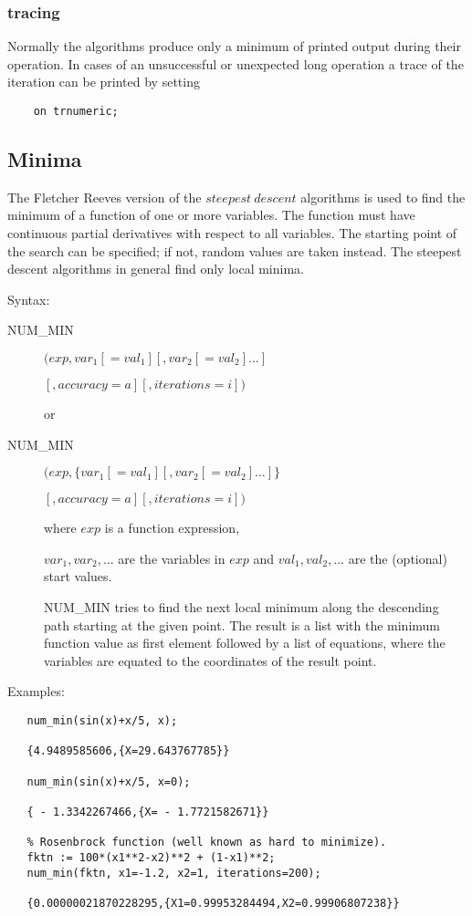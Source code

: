 \subsubsection{tracing}

Normally the algorithms produce only a minimum of printed
output during their operation. In cases of an unsuccessful
or unexpected long operation a trace of the iteration can be
printed by setting
\begin{verbatim}
    on trnumeric;
\end{verbatim}


\subsection{Minima}

The Fletcher Reeves version of the $steepest\ descent$
algorithms is used to find the minimum of a
function of one or more variables. The
function must have continuous partial derivatives with respect to all
variables. The starting point of the search can be
specified; if not, random values are taken instead.
The steepest descent algorithms in general find only local
minima.

Syntax:

\begin{description}
\item[NUM\_MIN] $(exp, var_1[=val_1] [,var_2[=val_2] \ldots]$

$             [,accuracy=a][,iterations=i]) $

or

\item[NUM\_MIN] $(exp, \{ var_1[=val_1] [,var_2[=val_2] \ldots] \}$

$             [,accuracy=a][,iterations=i]) $


where $exp$ is a function expression,

$var_1, var_2, \ldots$ are the variables in $exp$ and
$val_1,val_2, \ldots$ are the (optional) start values.

NUM\_MIN tries to find the next local minimum along the descending
path starting at the given point. The result is a list
with the minimum function value as first element followed by a list
of equations, where the variables are equated to the coordinates
of the result point.
\end{description}

Examples:

\begin{verbatim}
   num_min(sin(x)+x/5, x);

   {4.9489585606,{X=29.643767785}}

   num_min(sin(x)+x/5, x=0);

   { - 1.3342267466,{X= - 1.7721582671}}

   % Rosenbrock function (well known as hard to minimize).
   fktn := 100*(x1**2-x2)**2 + (1-x1)**2;
   num_min(fktn, x1=-1.2, x2=1, iterations=200);

   {0.00000021870228295,{X1=0.99953284494,X2=0.99906807238}}

\end{verbatim}

